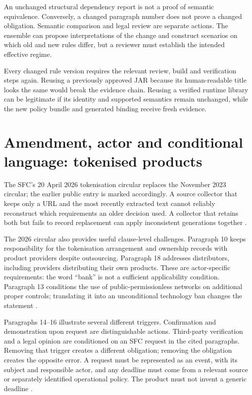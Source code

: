 \documentclass[12pt,a4paper,oneside,openany]{book}
\begin{document}
An unchanged structural dependency report is not a proof of semantic equivalence.
Conversely, a changed paragraph number does not prove a changed obligation.
Semantic comparison and legal review are separate actions. The ensemble can
propose interpretations of the change and construct scenarios on which old and
new rules differ, but a reviewer must establish the intended effective regime.

Every changed rule version requires the relevant review, build and verification
steps again. Reusing a previously approved JAR because its human-readable title
looks the same would break the evidence chain. Reusing a verified runtime library
can be legitimate if its identity and supported semantics remain unchanged, while
the new policy bundle and generated binding receive fresh evidence.

\section{Amendment, actor and conditional language: tokenised products}
\label{merge:P-01-problem:03}


The SFC's 20 April 2026 tokenisation circular replaces the November 2023 circular;
the earlier public entry is marked accordingly. A source collector that keeps
only a URL and the most recently extracted text cannot reliably reconstruct
which requirements an older decision used. A collector that retains both but
fails to record replacement can apply inconsistent generations together
\citep{sfctoken2023,sfctoken2026}.

The 2026 circular also provides useful clause-level challenges. Paragraph 10
keeps responsibility for the tokenisation arrangement and ownership records
with product providers despite outsourcing. Paragraph 18 addresses distributors,
including providers distributing their own products. These are actor-specific
requirements: the word ``bank'' is not a sufficient applicability condition.
Paragraph 13 conditions the use of public-permissionless networks on additional
proper controls; translating it into an unconditional technology ban changes the
statement \citep[paras.~10, 13, 18]{sfctoken2026}.

Paragraphs 14--16 illustrate several different triggers. Confirmation and
demonstration upon request are distinguishable actions. Third-party verification
and a legal opinion are conditioned on an SFC request in the cited paragraphs.
Removing that trigger creates a different obligation; removing the obligation
creates the opposite error. A request must be represented as an event, with its
subject and responsible actor, and any deadline must come from a relevant source
or separately identified operational policy. The product must not invent a
generic deadline \citep[paras.~14--16]{sfctoken2026}.
\end{document}
